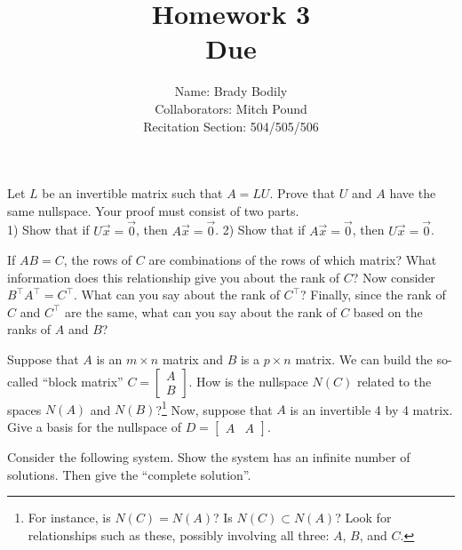 \documentclass[]{exam}
\title{Homework 3\\
	Due \DTMdate{2020-02-21} %
	}
\date{ %
	}
\author{Name: Brady Bodily \\
		\footnotesize Collaborators: Mitch Pound  \\
		\footnotesize Recitation Section: 504/505/506
		}
\begin{document}
\maketitle

\printanswers %

\begin{questions}
	\question Let $L$ be an invertible matrix such that $A = LU$. Prove that $U$ and $A$ have the same nullspace. Your proof must consist of two parts. \\
	1) Show that if $U\vec{x}=\vec{0}$, then $A\vec{x}=\vec{0}$.
	2) Show that if $A\vec{x}=\vec{0}$, then $U\vec{x}=\vec{0}$.
	
	\begin{solution}
	    
	\end{solution}
	
	\question If $AB=C$, the rows of $C$ are combinations of the rows of which matrix? What information does this relationship give you about the rank of $C$? Now consider $B^\intercal A^\intercal= C^\intercal$. What can you say about the rank of $C^\intercal$? Finally, since the rank of $C$ and $C^\intercal$ are the same, what can you say about the rank of $C$ based on the ranks of $A$ and $B$? 
	
	\begin{solution}
	    
	\end{solution}
	
	\question Suppose that $A$ is an $m \times n$ matrix and $B$ is a $p \times n$ matrix. We can build the so-called ``block matrix'' $C = \begin{bmatrix} A \\ B \end{bmatrix}$. How is the nullspace $N(C)$ related to the spaces $N(A)$ and $N(B)$?\footnote{For instance, is $N(C)=N(A)$? Is $N(C) \subset N(A)$? Look for relationships such as these, possibly involving all three: $A$, $B$, and $C$.} Now, suppose that $A$ is an invertible 4 by 4 matrix. Give a basis for the nullspace of $D = \begin{bmatrix} A & A \end{bmatrix}$. 
	
	\begin{solution}
	    
	\end{solution}
	
	\question Consider the following system. Show the system has an infinite number of solutions. Then give the ``complete solution''. 
	

\end{questions}
\end{document}
